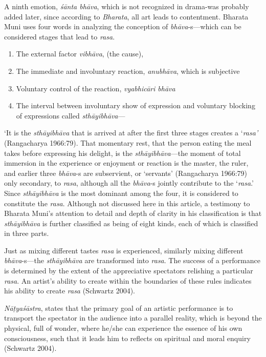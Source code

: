 A ninth emotion, \textsl{śānta bhāva},  which is not recognized in drama-was probably added later, since according to \textsl{Bharata}, all art leads to contentment. Bharata Muni uses four words in analyzing the conception of \textsl{bhāva}-s---which can be considered stages that lead to \textsl{rasa}. 
\begin{enumerate}
\itemsep=1pt
\item The external factor \textsl{vibhāva}, (the cause), 
\item The immediate and involuntary reaction, \textsl{anubhāva}, which is subjective
\item Voluntary control of the reaction, \textsl{vyabhicāri bhāva}
\item The interval between involuntary show of expression and voluntary blocking of expressions called \textsl{sthāyibhāva}---
\end{enumerate}

‘It is the \textsl{sthāyibhāva} that is arrived at after the first three stages creates a ‘\textsl{rasa’} (Rangacharya 1966:79). That momentary rest, that the person eating the meal takes before expressing his delight, is the \textsl{sthāyibhāva}---the moment of total immersion in the experience or enjoyment or reaction is the master, the ruler, and earlier three \hbox{\textsl{bhāva}-s} are subservient, or ‘servants’ (Rangacharya 1966:79) only secondary, to \textsl{rasa}, although all the \textsl{bhāva}-s jointly contribute to the ‘\textsl{rasa}.’ Since \textsl{sthāyibhāva} is the most dominant among the four, it is considered to constitute the \textsl{rasa}. Although not discussed here in this article, a testimony to Bharata Muni’s attention to detail and depth of clarity in his classification is that \textsl{sthāyibhāva} is further classified as being of eight kinds, each of which is classified in three parts. 

Just as mixing different tastes \textsl{rasa} is experienced, similarly mixing different \textsl{bhāva}-s---the \textsl{sthāyibhāva} are transformed into \textsl{rasa}. The success of a performance is determined by the extent of the appreciative spectators relishing a particular \textsl{rasa}. An artist’s ability to create within the boundaries of these rules indicates his ability to create \textsl{rasa} (Schwartz 2004). 


\textsl{Nāṭyaśāstra}, states that the primary goal of an artistic performance is to transport the spectator in the audience into a parallel reality, which is beyond the physical, full of wonder, where he/she can experience the essence of his own consciousness, such that it leads him to reflects on spiritual and moral enquiry (Schwartz 2004). 

